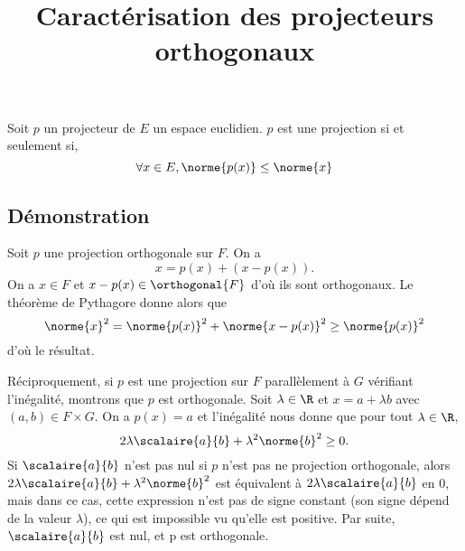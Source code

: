 \documentclass[fontsize=12pt,twoside=false,parskip=half, french]{scrartcl}
\title{Caractérisation des projecteurs orthogonaux}
\date{}
\author{}
\begin{document}
\maketitle
   \begin{Theoreme}
      Soit $p$ un projecteur de $E$ un espace euclidien. $p$ est une projection 
      si et seulement si,
      \[
         \forall x \in E, \norme{p(x)} \leq \norme{x}
      \]
   \end{Theoreme}
   \subsection{Démonstration}
      Soit $p$ une projection orthogonale sur $F$. On a
      \[
         x = p(x) + (x - p(x)).
      \]
      On a $x \in F$ et $x - p(x) \in \orthogonal{F}$ d’où ils sont orthogonaux. 
      Le théorème de Pythagore donne alors que 
      \[
         \norme{x}^2 = \norme{p(x)}^2 + \norme{x - p(x)}^2 \geq \norme{p(x)}^2
      \]
      d’où le résultat.
      
      Réciproquement, si $p$ est une projection sur $F$ parallèlement à $G$ vérifiant
      l’inégalité, montrons que $p$ est orthogonale. Soit $\lambda \in \R$ et 
      $x = a + \lambda b$ avec $(a, b) \in F \times G$. On a $p(x) = a$ et l’inégalité
      nous donne que pour tout $\lambda \in \R$,
      \[
         2 \lambda \scalaire{a}{b} + \lambda^2\norme{b}^2 \geq 0.
      \]
      Si $\scalaire{a}{b}$ n’est pas nul \ie{} si $p$ n’est pas ne projection orthogonale,
      alors $2 \lambda \scalaire{a}{b} + \lambda^2\norme{b}^2$ est équivalent à 
      $2 \lambda \scalaire{a}{b}$ en $0$, mais dans ce cas, cette expression n’est pas 
      de signe constant (son signe dépend de la valeur $\lambda$), ce qui est impossible
      vu qu’elle est positive. Par suite, $\scalaire{a}{b}$ est nul, et p est orthogonale.
\end{document}
